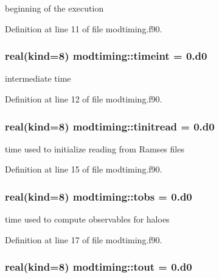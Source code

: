 beginning of the execution 



Definition at line 11 of file modtiming.\-f90.

\hypertarget{classmodtiming_a724cb127b8168bf0645e4070d83a34c0}{
\subsubsection[{timeint}]{\setlength{\rightskip}{0pt plus 5cm}real(kind=8) modtiming\-::timeint = 0.d0}}\label{classmodtiming_a724cb127b8168bf0645e4070d83a34c0}


intermediate time 



Definition at line 12 of file modtiming.\-f90.

\hypertarget{classmodtiming_a6c37469e0c299e5eb7c4b21eec1f2405}{
\subsubsection[{tinitread}]{\setlength{\rightskip}{0pt plus 5cm}real(kind=8) modtiming\-::tinitread = 0.d0}}\label{classmodtiming_a6c37469e0c299e5eb7c4b21eec1f2405}


time used to initialize reading from Ramses files 



Definition at line 15 of file modtiming.\-f90.

\hypertarget{classmodtiming_a83f5f02456356934410977b127c6308c}{
\subsubsection[{tobs}]{\setlength{\rightskip}{0pt plus 5cm}real(kind=8) modtiming\-::tobs = 0.d0}}\label{classmodtiming_a83f5f02456356934410977b127c6308c}


time used to compute observables for haloes 



Definition at line 17 of file modtiming.\-f90.

\hypertarget{classmodtiming_aad2ce715be55a32442a507f77e24f096}{
\subsubsection[{tout}]{\setlength{\rightskip}{0pt plus 5cm}real(kind=8) modtiming\-::tout = 0.d0}}\label{classmodtiming_aad2ce715be55a32442a507f77e24f096}


